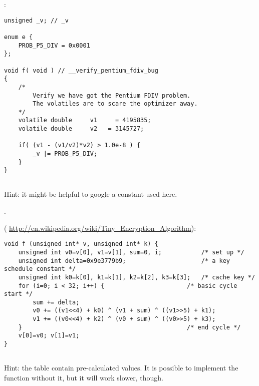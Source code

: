 :

\begin{lstlisting}
unsigned _v; // _v

enum e {
    PROB_P5_DIV = 0x0001
};

void f( void ) // __verify_pentium_fdiv_bug
{
    /*
        Verify we have got the Pentium FDIV problem.
        The volatiles are to scare the optimizer away.
    */
    volatile double     v1     = 4195835;
    volatile double     v2   = 3145727;

    if( (v1 - (v1/v2)*v2) > 1.0e-8 ) {
        _v |= PROB_P5_DIV;
    }
}
\end{lstlisting}

\subsection{}

{Hint: it might be helpful to google a constant used here.}

.

 ( \url{http://en.wikipedia.org/wiki/Tiny_Encryption_Algorithm}):

\begin{lstlisting}
void f (unsigned int* v, unsigned int* k) {
    unsigned int v0=v[0], v1=v[1], sum=0, i;           /* set up */
    unsigned int delta=0x9e3779b9;                     /* a key schedule constant */
    unsigned int k0=k[0], k1=k[1], k2=k[2], k3=k[3];   /* cache key */
    for (i=0; i < 32; i++) {                       /* basic cycle start */
        sum += delta;
        v0 += ((v1<<4) + k0) ^ (v1 + sum) ^ ((v1>>5) + k1);
        v1 += ((v0<<4) + k2) ^ (v0 + sum) ^ ((v0>>5) + k3);  
    }                                              /* end cycle */
    v[0]=v0; v[1]=v1;
}
\end{lstlisting}

\subsection{}

{Hint: the table contain pre-calculated values.
It is possible to implement the function without it, but it will work slower, though.}

